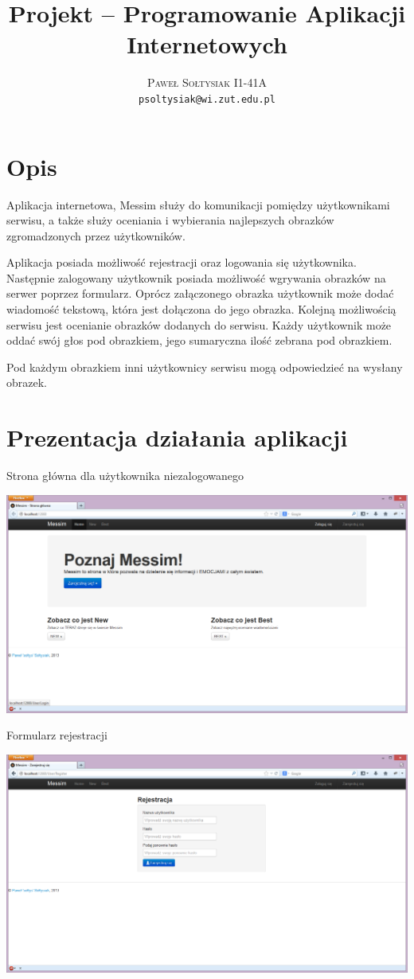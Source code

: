 \documentclass{article}
\title{Projekt -- Programowanie Aplikacji Internetowych}
\author{\textsc{Paweł Sołtysiak I1-41A} \\ \texttt{psoltysiak@wi.zut.edu.pl}}
\begin{document}
\maketitle

\section{Opis}
Aplikacja internetowa, Messim służy do komunikacji pomiędzy użytkownikami serwisu, a także służy oceniania i wybierania najlepszych obrazków zgromadzonych przez użytkowników.

Aplikacja posiada możliwość rejestracji oraz logowania się użytkownika. Następnie zalogowany użytkownik posiada możliwość wgrywania obrazków na serwer poprzez formularz. Oprócz załączonego obrazka użytkownik może dodać wiadomość tekstową, która jest dołączona do jego obrazka. Kolejną możliwością serwisu jest ocenianie obrazków dodanych do serwisu. Każdy użytkownik może oddać swój głos pod obrazkiem, jego sumaryczna ilość zebrana pod obrazkiem.

Pod każdym obrazkiem inni użytkownicy serwisu mogą odpowiedzieć na wysłany obrazek.


\section{Prezentacja działania aplikacji}
Strona główna dla użytkownika niezalogowanego

\includegraphics[width=\textwidth]{screenshots/home_page_not_singup}

Formularz rejestracji

\includegraphics[width=\textwidth]{screenshots/register_page}
\end{document}
